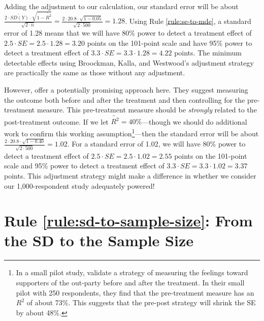 \documentclass[12pt]{article}
\begin{document}
Adding the adjustment to our calculation, our standard error will be about $\frac{2 \cdot \widetilde{SD(Y)}\cdot \sqrt{1 - \widetilde{R^{2}}}}{\sqrt{2 \cdot n}} = \frac{2 \cdot 20.8 \cdot \sqrt{1 - 0.05}}{\sqrt{2 \cdot 500}} = 1.28$.
Using Rule \ref{rule:se-to-mde}, a standard error of 1.28 means that we will have 80\% power to detect a treatment effect of $2.5 \cdot SE = 2.5 \cdot 1.28 = 3.20$ points on the 101-point scale and have 95\% power to detect a treatment effect of $3.3 \cdot SE = 3.3 \cdot 1.28 = 4.22$ points. 
The minimum detectable effects using Broockman, Kalla, and Westwood's adjustment strategy are practically the same as those without any adjustment.

However, \cite{Clifford2021} offer a potentially promising approach here. 
They suggest measuring the outcome both before and after the treatment and then controlling for the pre-treatment measure. 
This pre-treatment measure should be \emph{strongly} related to the post-treatment outcome. 
If we let $\widetilde{R^{2}} = 40\%$---though we should do additional work to confirm this working assumption\footnote{
  In a small pilot study, \cite{Culter2024} validate a strategy of measuring the feelings toward supporters of the out-party before and after the treatment. 
  In their small pilot with 250 respondents, they find that the pre-treatment measure has an $R^{2}$ of about 73\%. 
  This suggests that the pre-post strategy will shrink the SE by about 48\%.}---then the standard error will be about $\frac{2 \cdot 20.8 \cdot \sqrt{1 - 0.40}}{\sqrt{2 \cdot 500}} = 1.02$. 
For a standard error of 1.02, we will have 80\% power to detect a treatment effect of $2.5 \cdot SE = 2.5 \cdot 1.02 = 2.55$ points on the 101-point scale and 95\% power to detect a treatment effect of $3.3 \cdot SE = 3.3 \cdot 1.02 = 3.37$ points. 
This adjustment strategy might make a difference in whether we consider our 1,000-respondent study adequately powered!

\section*{Rule \ref{rule:sd-to-sample-size}: From the SD to the Sample Size}
\end{document}
